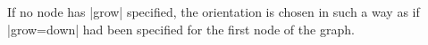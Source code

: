 \begin{enumerate}
  If no node has |grow| specified, the orientation is chosen in such a
  way as if |grow=down| had been specified for the first node of the
  graph.   
\end{enumerate}





  


